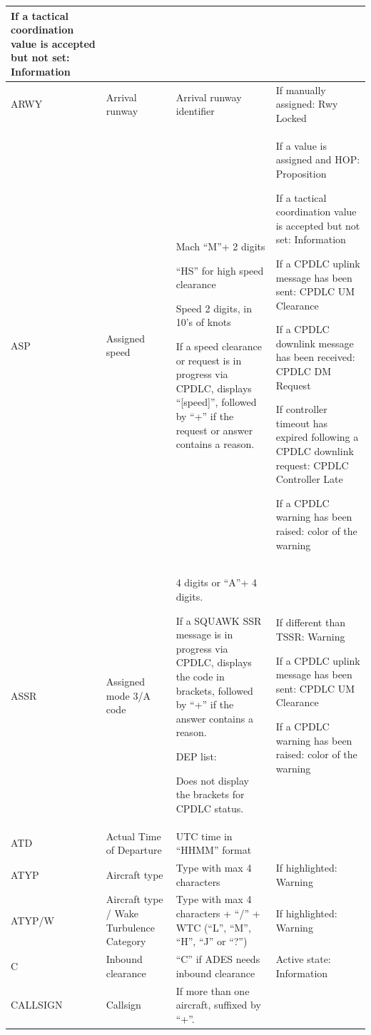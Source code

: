 \documentclass[11pt,a4paper]{memoir}
\begin{document}
\begin{longtable}{|p{2.5cm}|p{2.5cm}|p{4.5cm}|p{4.5cm}|}
      If a tactical coordination value is accepted but not set: Information \\ \hline
    ARWY &
      Arrival runway &
      Arrival runway identifier &
      If manually assigned: Rwy Locked \\ \hline
    ASP &
      Assigned speed &
      Mach “M”+ 2 digits
      \bigskip

      “HS” for high speed clearance 
      \bigskip

      Speed 2 digits, in 10’s of knots
      \bigskip
      
      If a speed clearance or request is in  progress via CPDLC, displays  “{[}speed{]}”, followed by “+” if the  request or answer contains a reason. &
      If a value is assigned and  HOP: Proposition 
      \smallskip

      If a tactical coordination  value is accepted but not  set: Information 
      \smallskip
      
      If a CPDLC uplink message  has been sent:  CPDLC UM Clearance 
      \smallskip
      
      If a CPDLC downlink  message has been  received:  CPDLC DM Request 
      \smallskip
      
      If controller timeout has expired following a CPDLC  downlink request:  CPDLC Controller Late 
      \smallskip
      
      If a CPDLC warning has  been raised: color of the  warning \\ \hline
    ASSR &
      Assigned mode 3/A code &
      4 digits or “A”+ 4 digits. 
      \bigskip

      If a SQUAWK SSR message is in  progress via CPDLC, displays the  code in brackets, followed by “+” if  the answer contains a reason. 
      \bigskip

      DEP list:
      
      Does not display the  brackets for CPDLC status. &
      If different than TSSR:  Warning 
      \smallskip

      If a CPDLC uplink message  has been sent:  CPDLC UM Clearance 
      \smallskip
      
      If a CPDLC warning has  been raised: color of the  warning \\ \hline
    ATD &
      Actual Time of Departure &
      UTC time in “HHMM” format &
       \\ \hline
    ATYP &
      Aircraft type &
      Type with max 4 characters &
      If highlighted: Warning \\ \hline
    ATYP/W &
      Aircraft type / Wake  Turbulence Category &
      Type with max 4 characters + “/” +  WTC (“L”, “M”, “H”, “J” or “?”) &
      If highlighted: Warning \\ \hline
    C &
      Inbound clearance &
      “C” if ADES needs inbound clearance &
      Active state: Information \\ \hline
    CALLSIGN &
      Callsign &
      If more than one aircraft, suffixed  by “+”. 
      \bigskip
      

\end{longtable}
\end{document}
